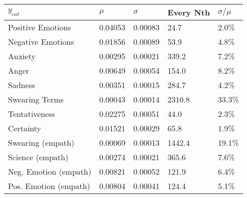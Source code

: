 \begin{tabular}{lllll}
\toprule
$y_{cat}$ &    $\mu$ & $\sigma$ & Every Nth & $\sigma / \mu$ \\
\midrule
Positive Emotions     &  0.04053 &  0.00083 &      24.7 &          2.0\% \\
Negative Emotions     &  0.01856 &  0.00089 &      53.9 &          4.8\% \\
Anxiety               &  0.00295 &  0.00021 &     339.2 &          7.2\% \\
Anger                 &  0.00649 &  0.00054 &     154.0 &          8.2\% \\
Sadness               &  0.00351 &  0.00015 &     284.7 &          4.2\% \\
Swearing Terms        &  0.00043 &  0.00014 &    2310.8 &         33.3\% \\
Tentativeness         &  0.02275 &  0.00051 &      44.0 &          2.3\% \\
Certainty             &  0.01521 &  0.00029 &      65.8 &          1.9\% \\
Swearing (empath)     &  0.00069 &  0.00013 &    1442.4 &         19.1\% \\
Science (empath)      &  0.00274 &  0.00021 &     365.6 &          7.6\% \\
Neg. Emotion (empath) &  0.00821 &  0.00052 &     121.9 &          6.4\% \\
Pos. Emotion (empath) &  0.00804 &  0.00041 &     124.4 &          5.1\% \\
\bottomrule
\end{tabular}
